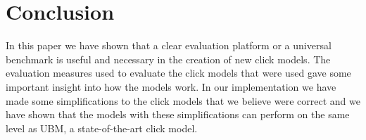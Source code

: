 \section{Conclusion}
\label{sec:conclusion}
In this paper we have shown that a clear evaluation platform or a universal benchmark is useful and necessary in the creation of new click models. The evaluation measures used to evaluate the click models that were used gave some important insight into how the models work. In our implementation we have made some simplifications to the click models that we believe were correct and we have shown that the models with these simplifications can perform on the same level as UBM, a state-of-the-art click model. 
